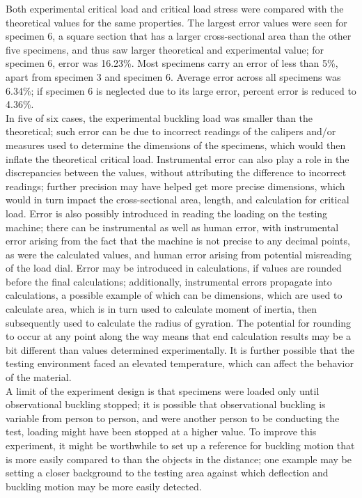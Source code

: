 \documentclass{article}
\begin{document}
    \indent Both experimental critical load and critical load stress were compared with the theoretical values for the same properties. The largest error values were seen for specimen 6, a square section that has a larger cross-sectional area than the other five specimens, and thus saw larger theoretical and experimental value; for specimen 6, error was 16.23\%. Most specimens carry an error of less than 5\%, apart from specimen 3 and specimen 6. Average error across all specimens was 6.34\%; if specimen 6 is neglected due to its large error, percent error is reduced to 4.36\%. \\
    \indent In five of six cases, the experimental buckling load was smaller than the theoretical; such error can be due to incorrect readings of the calipers and/or measures used to determine the dimensions of the specimens, which would then inflate the theoretical critical load. Instrumental error can also play a role in the discrepancies between the values, without attributing the difference to incorrect readings; further precision may have helped get more precise dimensions, which would in turn impact the cross-sectional area, length, and calculation for critical load. Error is also possibly introduced in reading the loading on the testing machine; there can be instrumental as well as human error, with instrumental error arising from the fact that the machine is not precise to any decimal points, as were the calculated values, and human error arising from potential misreading of the load dial. Error may be introduced in calculations, if values are rounded before the final calculations; additionally, instrumental errors propagate into calculations, a possible example of which can be dimensions, which are used to calculate area, which is in turn used to calculate moment of inertia, then subsequently used to calculate the radius of gyration. The potential for rounding to occur at any point along the way means that end calculation results may be a bit different than values determined experimentally. It is further possible that the testing environment faced an elevated temperature, which can affect the behavior of the material.  \\
    \indent A limit of the experiment design is that specimens were loaded only until observational buckling stopped; it is possible that observational buckling is variable from person to person, and were another person to be conducting the test, loading might have been stopped at a higher value. To improve this experiment, it might be worthwhile to set up a reference for buckling motion that is more easily compared to than the objects in the distance; one example may be setting a closer background to the testing area against which deflection and buckling motion may be more easily detected.  \\
\end{document}
